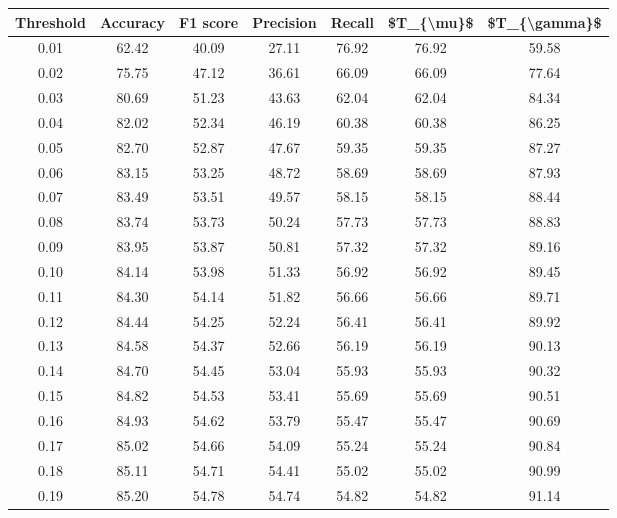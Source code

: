 \begin{tabular}{|c|c|c|c|c|c|c|}
\toprule
 Threshold &  Accuracy &  F1 score &  Precision &  Recall &  \$T\_\{\textbackslash mu\}\$ &  \$T\_\{\textbackslash gamma\}\$ \\
\hline
      0.01 &     62.42 &     40.09 &      27.11 &   76.92 &      76.92 &         59.58 \\
      0.02 &     75.75 &     47.12 &      36.61 &   66.09 &      66.09 &         77.64 \\
      0.03 &     80.69 &     51.23 &      43.63 &   62.04 &      62.04 &         84.34 \\
      0.04 &     82.02 &     52.34 &      46.19 &   60.38 &      60.38 &         86.25 \\
      0.05 &     82.70 &     52.87 &      47.67 &   59.35 &      59.35 &         87.27 \\
      0.06 &     83.15 &     53.25 &      48.72 &   58.69 &      58.69 &         87.93 \\
      0.07 &     83.49 &     53.51 &      49.57 &   58.15 &      58.15 &         88.44 \\
      0.08 &     83.74 &     53.73 &      50.24 &   57.73 &      57.73 &         88.83 \\
      0.09 &     83.95 &     53.87 &      50.81 &   57.32 &      57.32 &         89.16 \\
      0.10 &     84.14 &     53.98 &      51.33 &   56.92 &      56.92 &         89.45 \\
      0.11 &     84.30 &     54.14 &      51.82 &   56.66 &      56.66 &         89.71 \\
      0.12 &     84.44 &     54.25 &      52.24 &   56.41 &      56.41 &         89.92 \\
      0.13 &     84.58 &     54.37 &      52.66 &   56.19 &      56.19 &         90.13 \\
      0.14 &     84.70 &     54.45 &      53.04 &   55.93 &      55.93 &         90.32 \\
      0.15 &     84.82 &     54.53 &      53.41 &   55.69 &      55.69 &         90.51 \\
      0.16 &     84.93 &     54.62 &      53.79 &   55.47 &      55.47 &         90.69 \\
      0.17 &     85.02 &     54.66 &      54.09 &   55.24 &      55.24 &         90.84 \\
      0.18 &     85.11 &     54.71 &      54.41 &   55.02 &      55.02 &         90.99 \\
      0.19 &     85.20 &     54.78 &      54.74 &   54.82 &      54.82 &         91.14 \\

\end{tabular}
